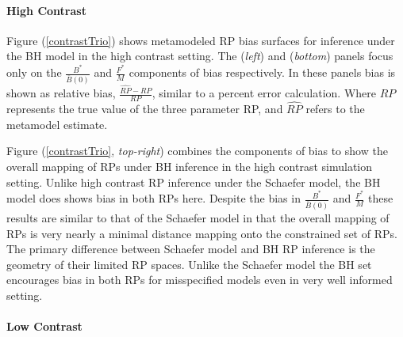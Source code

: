 \documentclass[12pt]{article}
\begin{document}
%
\paragraph{High Contrast}

%
Figure (\ref{contrastTrio}) shows metamodeled RP bias surfaces for inference 
under the BH model in the high contrast setting. The (\emph{left}) and 
(\emph{bottom}) panels focus only on the $\frac{B^*}{\bar B(0)}$ and 
$\frac{F^*}{M}$ components of bias respectively. In these panels bias is shown
as relative bias, $\frac{\hat{RP}-RP}{RP}$, similar to a percent error calculation.
Where $RP$ represents the true value of the three parameter RP, and $\hat{RP}$ 
refers to the metamodel estimate.

%
Figure (\ref{contrastTrio}, \emph{top-right}) combines the components of bias to 
show the overall mapping of RPs under BH inference in the high contrast 
simulation setting. Unlike high contrast RP inference under the Schaefer model, 
the BH model does shows bias in both RPs here. Despite the bias in 
$\frac{B^*}{\bar B(0)}$ and $\frac{F^*}{M}$ these results are similar to 
that of the Schaefer model in that the overall mapping of RPs is very nearly a 
minimal distance mapping onto the constrained set of RPs. %
The primary difference between Schaefer model and BH RP inference is the geometry of 
their limited RP spaces. Unlike the Schaefer model the BH set encourages
bias in both RPs for misspecified models even in very well informed setting.

%
%
%


\paragraph{Low Contrast}
\end{document}
